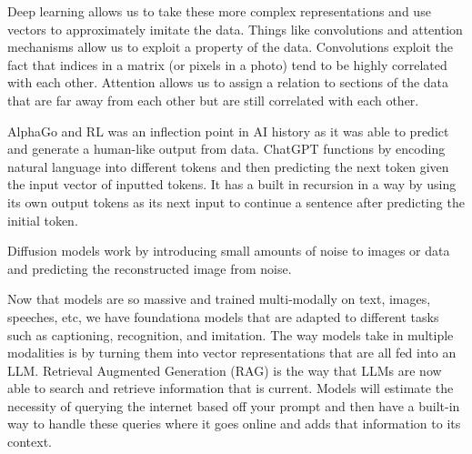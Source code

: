 \documentclass[11pt]{article}
\begin{document}
Deep learning allows us to take these more complex representations and use vectors to approximately imitate the data.
Things like convolutions and attention mechanisms allow us to exploit a property of the data.
Convolutions exploit the fact that indices in a matrix (or pixels in a photo) tend to be highly correlated with each other.
Attention allows us to assign a relation to sections of the data that are far away from each other but are still correlated with each other.

AlphaGo and RL was an inflection point in AI history as it was able to predict and generate a human-like output from data.
ChatGPT functions by encoding natural language into different tokens and then predicting the next token given the input vector of inputted tokens.
It has a built in recursion in a way by using its own output tokens as its next input to continue a sentence after predicting the initial token.

Diffusion models work by introducing small amounts of noise to images or data and predicting the reconstructed image from noise.

Now that models are so massive and trained multi-modally on text, images, speeches, etc, we have foundationa models that are adapted to different tasks such as captioning, recognition, and imitation.
The way models take in multiple modalities is by turning them into vector representations that are all fed into an LLM.
Retrieval Augmented Generation (RAG) is the way that LLMs are now able to search and retrieve information that is current.
Models will estimate the necessity of querying the internet based off your prompt and then have a built-in way to handle these queries where it goes online and adds that information to its context.
\end{document}
